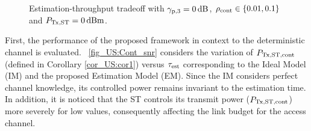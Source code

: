 \begin{figure}[!t]

\centering
{}
\caption{Estimation-throughput tradeoff with ${\gamma}_{\text{p,3}} = \SI{0}{dB}$, $\rho_{\text{cont}} \in \{0.01, 0.1\}$ and $P_{\text{Tx,ST}} = \SI{0}{dBm}$.}
\label{fig_US:ETT}
\end{figure}
First, the performance of the proposed framework in context to the deterministic channel is evaluated. \figurename~\ref{fig_US:Cont_snr} considers the variation of $P_{\text{Tx,ST,cont}}$ (defined in Corollary \ref{cor_US:cor1}) versus $\tau_{\text{est}}$ corresponding to the Ideal Model (IM) and the proposed Estimation Model (EM). Since the IM considers perfect channel knowledge, its controlled power remains invariant to the estimation time. In addition, it is noticed that the ST controls its transmit power ($P_{\text{Tx,ST,cont}}$) more severely for low values, consequently affecting the link budget for the access channel. %
